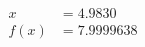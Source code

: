 \documentclass[preview]{standalone}
\begin{document}
\begin{align*}
x &= 4.9830\\f(x) &= 7.9999638
\end{align*}
\end{document}
